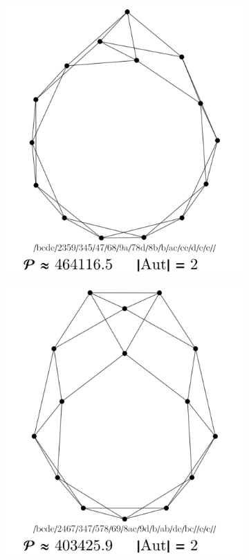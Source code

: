 \documentclass[12pt,a4paper]{article}
\renewcommand{\|}{\rule[-0.4ex]{0.2ex}{1.2em}}
\begin{document}
\begin{figure}[htb]
\begin{subfigure}[b]{.24 \textwidth}
		\subcaption{}
	\end{subfigure}
	\begin{subfigure}[b]{.24 \textwidth}
		\includegraphics[width=\linewidth]{largest_13_3}
		\subcaption{}
	\end{subfigure}
	\begin{subfigure}[b]{.24 \textwidth}
		\includegraphics[width=\linewidth]{largest_13_4}
		\subcaption{}
	\end{subfigure}
	

\end{figure}
\end{document}

